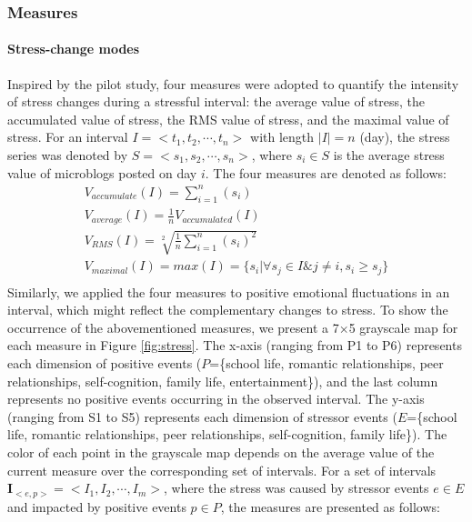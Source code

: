 \documentclass[5p,times,numbers,authoryear]{elsarticle}
\begin{document}
\subsubsection{Measures}
\label{subsubM}
\paragraph{\textbf{Stress-change modes}}
Inspired by the pilot study, four measures were adopted to quantify the intensity of stress changes during a stressful interval: the average value of stress, the accumulated value of stress, the RMS value of stress, and the maximal value of stress.
For an interval $I=<t_1,t_2,\cdots,t_n>$ with length $|I|=n$ (day), the stress series was denoted by $S=<s_1,s_2,\cdots,s_n>$, where $s_i \in S$ is the average stress value of microblogs posted on day $i$.
The four measures are denoted as follows:
\begin{equation}
\begin{aligned}
&V_{accumulate}(I)= \sum_{i=1}^{n}(s_i)&\\
&V_{average}(I)= \frac{1}{n}V_{accumulated}(I)&\\
&V_{RMS}(I) = \sqrt[2]{ \frac{1}{n}\sum_{i=1}^{n}{(s_i)^2}}&\\
&V_{maximal}(I) = max(I) = \{s_i |\forall s_j \in I \& j \neq i, s_i \geq s_j\}&\\
 \end{aligned}
 \end{equation}
Similarly, we applied the four measures to positive emotional fluctuations in an interval,
which might reflect the complementary changes to stress.
To show the occurrence of the abovementioned measures, we present a 7$\times$5 grayscale map for each measure in Figure \ref{fig:stress}.
The x-axis (ranging from P1 to P6) represents each dimension of positive events
($P$=\{school life, romantic relationships, peer relationships, self-cognition, family life, entertainment\}), and the last column represents no positive events occurring in the observed interval.
The y-axis (ranging from S1 to S5) represents each dimension of stressor events
($E$=\{school life, romantic relationships, peer relationships, self-cognition, family life\}).
The color of each point in the grayscale map depends on the average value of the current measure over the corresponding set of intervals.
For a set of intervals $\textbf{I}_{<e,p>} = <I_1,I_2,\cdots,I_m>$, where the stress was caused by stressor events $e \in E$ and impacted by positive events $p \in P$, the measures are presented as follows:
\end{document}
